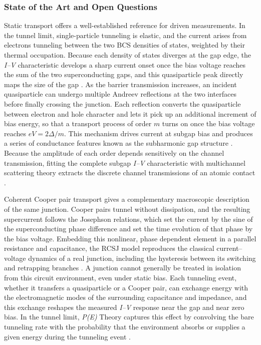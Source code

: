     \subsubsection*{State of the Art and Open Questions}

    Static transport offers a well-established reference for driven measurements. In the tunnel limit, single-particle tunneling is elastic, and the current arises from electrons tunneling between the two BCS densities of states, weighted by their thermal occupation. Because each density of states diverges at the gap edge, the \textit{I--V} characteristic develops a sharp current onset once the bias voltage reaches the sum of the two superconducting gaps, and this quasiparticle peak directly maps the size of the gap \cite{bardeen_tunnelling_1961,giaever_study_1961}. As the barrier transmission increases, an incident quasiparticle can undergo multiple Andreev reflections at the two interfaces before finally crossing the junction. Each reflection converts the quasiparticle between electron and hole character and lets it pick up an additional increment of bias energy, so that a transport process of order \(m\) turns on once the bias voltage reaches \(eV = 2\Delta/m\). This mechanism drives current at subgap bias and produces a series of conductance features known as the subharmonic gap structure \cite{averin_ac_1995,cuevas_hamiltonian_1996}. Because the amplitude of each order depends sensitively on the channel transmission, fitting the complete subgap \textit{I--V} characteristic with multichannel scattering theory extracts the discrete channel transmissions of an atomic contact \cite{scheer_conduction_1997,agrait_quantum_2003}.

    Coherent Cooper pair transport gives a complementary macroscopic description of the same junction. Cooper pairs tunnel without dissipation, and the resulting supercurrent follows the Josephson relations, which set the current by the sine of the superconducting phase difference and set the time evolution of that phase by the bias voltage. Embedding this nonlinear, phase dependent element in a parallel resistance and capacitance, the RCSJ model reproduces the classical current--voltage dynamics of a real junction, including the hysteresis between its switching and retrapping branches \cite{josephson_possible_1962,stewart_currentvoltage_1968,mccumber_effect_1968}. A junction cannot generally be treated in isolation from this circuit environment, even under static bias. Each tunneling event, whether it transfers a quasiparticle or a Cooper pair, can exchange energy with the electromagnetic modes of the surrounding capacitance and impedance, and this exchange reshapes the measured \textit{I--V} response near the gap and near zero bias. In the tunnel limit, \textit{P(E)} Theory captures this effect by convolving the bare tunneling rate with the probability that the environment absorbs or supplies a given energy during the tunneling event \cite{falci_quasiparticle_1991,ingold_charge_1992}.

